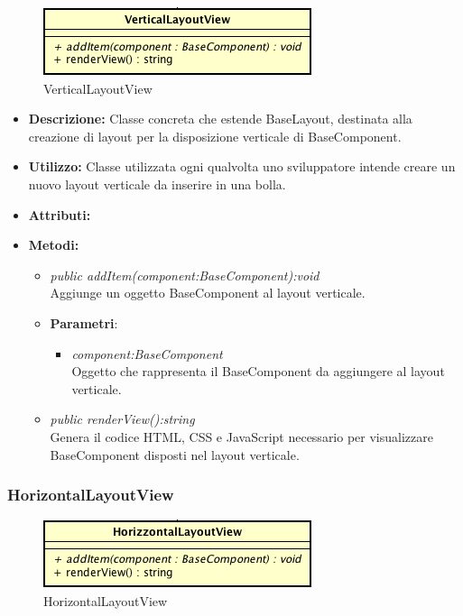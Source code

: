 \label{VerticalLayoutView}
\begin{figure}[ht]
	\centering
	\includegraphics[scale=0.5]{Sezioni/SottosezioniST/img/VerticalLayoutView.png}
	\caption{VerticalLayoutView}
\end{figure}

\begin{itemize}
\item \textbf{Descrizione:} Classe concreta che estende BaseLayout, destinata alla creazione di layout per la disposizione verticale di BaseComponent.
\item \textbf{Utilizzo:} Classe utilizzata ogni qualvolta uno sviluppatore intende creare un nuovo layout verticale da inserire in una bolla.
\item \textbf{Attributi:}
\item \textbf{Metodi:}
\begin{itemize}
\item \textit{public addItem(component:BaseComponent):void}\\
Aggiunge un oggetto BaseComponent al layout verticale.
\item{\textbf{Parametri}: \begin{itemize}
\item \textit{component:BaseComponent}\\
Oggetto che rappresenta il BaseComponent da aggiungere al layout verticale.
\end{itemize}}
\item \textit{public renderView():string}\\
Genera il codice HTML, CSS e JavaScript necessario per visualizzare BaseComponent disposti nel layout verticale.
\end{itemize}
\end{itemize}

\subsubsection{HorizontalLayoutView}

\label{HorizontalLayoutView}
\begin{figure}[ht]
	\centering
	\includegraphics[scale=0.5]{Sezioni/SottosezioniST/img/HorizontalLayoutView.png}
	\caption{HorizontalLayoutView}
\end{figure}

